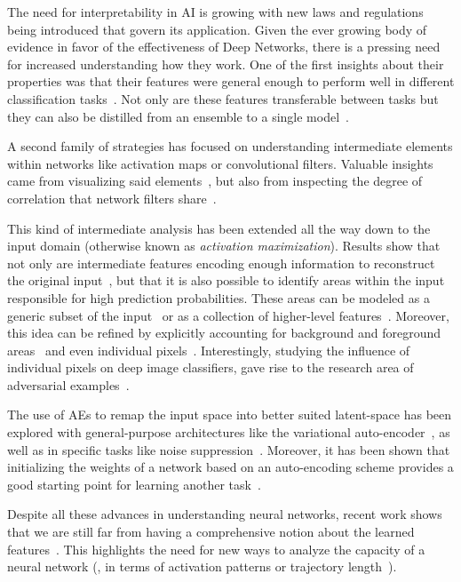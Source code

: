 \documentclass[10pt,twocolumn,a4paper]{article}
\begin{document}
The need for interpretability in AI is growing with new laws and regulations~\cite{GoodmanRegulations} being introduced that govern its application. Given the ever growing body of evidence in favor of the effectiveness of Deep Networks, there is a pressing need for increased understanding how they work.
One of the first insights about their properties was that their features were general enough to perform well in different classification tasks~\cite{yosinski2014transferable, sharif2014cnn}.
Not only are these features transferable between tasks but they can also be distilled from an ensemble to a single model~\cite{hinton2015distilling}.

A second family of strategies has focused on understanding intermediate elements within networks like activation maps or convolutional filters.
Valuable insights came from visualizing said elements~\cite{zeiler2014visualizing}, but also from inspecting the degree of correlation that network filters share~\cite{li2015convergent}.

This kind of intermediate analysis has been extended all the way down to the input domain (otherwise known as \emph{activation maximization}).
Results show that not only are intermediate features encoding enough information to reconstruct the original input~\cite{mahendran2015understanding, dosovitskiy2016inverting}, but that it is also possible to identify areas within the input responsible for high prediction probabilities.
%
These areas can be modeled as a generic subset of the input~\cite{zhou2016learning, nguyen2016synthesizing} or as a collection of higher-level features~\cite{long2014convnets, netdissect2017}.
Moreover, this idea can be refined by explicitly accounting for background and foreground areas~\cite{simonyan2013deep} and even individual pixels~\cite{montavon2017explaining}.
Interestingly, studying the influence of individual pixels on deep image classifiers, gave rise to the research area of adversarial examples~\cite{szegedy2013intriguing}.

The use of AEs to remap the input space into better suited latent-space has been explored with general-purpose architectures like the variational auto-encoder~\cite{kingma2013auto}, as well as in specific tasks like noise suppression~\cite{vincent2010stacked}.
Moreover, it has been shown that initializing the weights of a network based on an auto-encoding scheme provides a good starting point for learning another task~\cite{masci2011stacked}.

Despite all these advances in understanding neural networks, recent work shows that we are still far from having a comprehensive notion about the learned features~\cite{zhang2016understanding}.
This highlights the need for new ways to analyze the capacity of a neural network (\eg, in terms of activation patterns or trajectory length~\cite{raghu2016expressive}).
\end{document}
